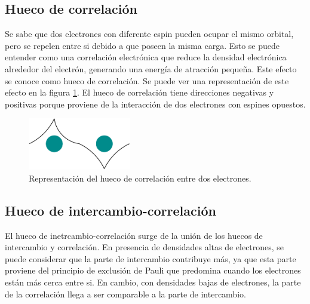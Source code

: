 
\subsection{Hueco de correlaci\'on}

Se sabe que dos electrones con diferente espin pueden ocupar el mismo orbital, 
pero se repelen entre si debido a que poseen la misma carga. Esto se puede 
entender como una correlaci\'on electr\'onica que reduce la densidad 
electr\'onica alrededor del electr\'on, generando una energ\'ia de atracci\'on 
peque\~na. 
Este efecto se conoce como hueco de correlaci\'on. Se puede ver una 
representaci\'on de este efecto en la figura \ref{HuecoCorrelacion}. El hueco 
de correlaci\'on tiene direcciones negativas y positivas porque proviene de la 
interacci\'on de dos electrones con espines opuestos.

\begin{figure}[H]
    \centering
    \includegraphics[width=0.4\textwidth]{contenido/marco_teorico/funcional_exchange_correlation/img_exchange_correlation/HuecoCorrelacion.png}
    \caption[Hueco de correlaci\'on]{Representaci\'on del hueco de 
    correlaci\'on entre dos electrones.}
    \label{HuecoCorrelacion}
\end{figure}


\subsection{Hueco de intercambio-correlaci\'on}

El hueco de inetrcambio-correlaci\'on surge de la uni\'on de los huecos de 
intercambio y correlaci\'on. En presencia de densidades altas de electrones, se 
puede considerar que la parte de intercambio contribuye m\'as, ya que esta 
parte proviene del principio de exclusi\'on de Pauli que predomina cuando los 
electrones est\'an m\'as cerca entre si. En cambio, con densidades bajas de 
electrones, la parte de la correlaci\'on llega a ser comparable a la parte de 
intercambio.


